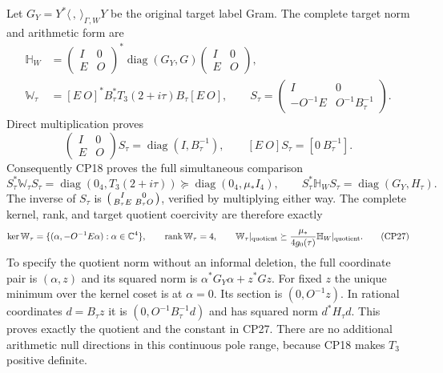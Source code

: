 \documentclass[11pt]{article}
\newcommand{\C}{\mathbb C}
\newcommand{\diag}{\operatorname{diag}}
\begin{document}
Let $G_Y=Y^*\langle\, ,\,\rangle_{\Gamma,W}Y$ be the
original target label Gram. The complete target norm and
arithmetic form are
\begin{align}
\mathbb H_W&=
\begin{pmatrix}I&0\\E&O\end{pmatrix}^{*}
\diag(G_Y,G)
\begin{pmatrix}I&0\\E&O\end{pmatrix},\nonumber\\
\mathbb W_\tau&=[E\ O]^*B_\tau^*T_3(2+i\tau)B_\tau[E\ O],
\qquad
S_\tau=\begin{pmatrix}I&0\\-O^{-1}E&O^{-1}B_\tau^{-1}\end{pmatrix}.
\tag{CP25}
\end{align}
Direct multiplication proves
\[
\begin{pmatrix}I&0\\E&O\end{pmatrix}S_\tau
=\diag(I,B_\tau^{-1}),\qquad
[E\ O]S_\tau=[0\ B_\tau^{-1}].
\]
Consequently CP18 proves the full simultaneous comparison
\begin{equation}
S_\tau^*\mathbb W_\tau S_\tau
=\diag(0_4,T_3(2+i\tau))
\succeq\diag(0_4,\mu_*I_4),\qquad
S_\tau^*\mathbb H_W S_\tau=\diag(G_Y,H_\tau).
\tag{CP26}
\end{equation}
The inverse of $S_\tau$ is
$\begin{psmallmatrix}I&0\\B_\tau E&B_\tau O\end{psmallmatrix}$,
verified by multiplying either way. The complete kernel, rank,
and target quotient coercivity are therefore exactly
\begin{equation}
\ker\mathbb W_\tau
=\{(\alpha,-O^{-1}E\alpha):\alpha\in\C^4\},\qquad
\operatorname{rank}\mathbb W_\tau=4,\qquad
\mathbb W_\tau|_{\rm quotient}
\succeq\frac{\mu_*}{4g_0(\tau)}
                         \mathbb H_W|_{\rm quotient}.
\tag{CP27}
\end{equation}
To specify the quotient norm without an informal deletion,
the full coordinate pair is $(\alpha,z)$ and its squared
norm is $\alpha^*G_Y\alpha+z^*Gz$.
For fixed $z$ the unique minimum over the kernel coset is
at $\alpha=0$. Its section is
$(0,O^{-1}z)$. In rational coordinates $d=B_\tau z$ it is
$(0,O^{-1}B_\tau^{-1}d)$ and has squared norm $d^*H_\tau d$.
This proves exactly the quotient and the constant in CP27.
There are no additional arithmetic null directions in this
continuous pole range, because CP18 makes $T_3$ positive definite.
\end{document}
